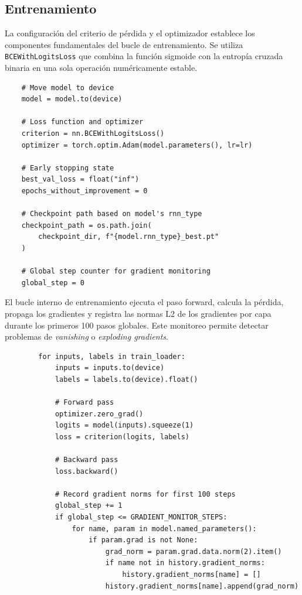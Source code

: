 \subsection{Entrenamiento}

La configuración del criterio de pérdida y el optimizador establece los componentes fundamentales del bucle de entrenamiento. Se utiliza \texttt{BCEWithLogitsLoss} que combina la función sigmoide con la entropía cruzada binaria en una sola operación numéricamente estable.

\begin{verbatim}
    # Move model to device
    model = model.to(device)

    # Loss function and optimizer
    criterion = nn.BCEWithLogitsLoss()
    optimizer = torch.optim.Adam(model.parameters(), lr=lr)

    # Early stopping state
    best_val_loss = float("inf")
    epochs_without_improvement = 0

    # Checkpoint path based on model's rnn_type
    checkpoint_path = os.path.join(
        checkpoint_dir, f"{model.rnn_type}_best.pt"
    )

    # Global step counter for gradient monitoring
    global_step = 0
\end{verbatim}

El bucle interno de entrenamiento ejecuta el paso forward, calcula la pérdida, propaga los gradientes y registra las normas L2 de los gradientes por capa durante los primeros 100 pasos globales. Este monitoreo permite detectar problemas de \textit{vanishing} o \textit{exploding gradients}.

\begin{verbatim}
        for inputs, labels in train_loader:
            inputs = inputs.to(device)
            labels = labels.to(device).float()

            # Forward pass
            optimizer.zero_grad()
            logits = model(inputs).squeeze(1)
            loss = criterion(logits, labels)

            # Backward pass
            loss.backward()

            # Record gradient norms for first 100 steps
            global_step += 1
            if global_step <= GRADIENT_MONITOR_STEPS:
                for name, param in model.named_parameters():
                    if param.grad is not None:
                        grad_norm = param.grad.data.norm(2).item()
                        if name not in history.gradient_norms:
                            history.gradient_norms[name] = []
                        history.gradient_norms[name].append(grad_norm)
\end{verbatim}

